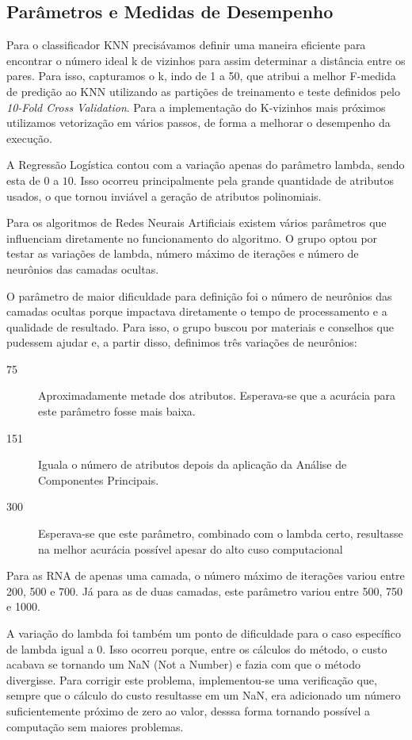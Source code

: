\documentclass[10pt, conference, compsocconf]{IEEEtran}
\begin{document}
\subsection{Parâmetros e Medidas de Desempenho}
Para o classificador KNN precisávamos definir uma maneira eficiente para 
encontrar o número ideal k de vizinhos para assim determinar a distância entre 
os pares. Para isso, capturamos o k, indo de 1 a 50, que atribui a melhor 
F-medida de predição ao KNN utilizando as partições de treinamento e teste 
definidos pelo \textsl{10-Fold Cross Validation}. Para a implementação do 
K-vizinhos mais próximos utilizamos vetorização em vários passos, de forma a melhorar o desempenho da execução.

A Regressão Logística contou com a variação apenas do parâmetro lambda, sendo
esta de $0$ a $10$. Isso
ocorreu principalmente pela grande quantidade de atributos usados, o que tornou
inviável a geração de atributos polinomiais. 


Para os algoritmos de Redes Neurais Artificiais existem vários parâmetros que
influenciam diretamente no funcionamento do algoritmo. O grupo optou por testar
as variações de lambda, número máximo de iterações e número de neurônios das
camadas ocultas. 

O parâmetro de maior dificuldade para definição foi o número de
neurônios das camadas ocultas porque impactava diretamente o tempo de
processamento e a qualidade de resultado. Para isso, o grupo buscou por
materiais e conselhos que pudessem ajudar e, a partir disso, definimos três
variações de neurônios: 
    \begin{description}
        \item[75]{Aproximadamente metade dos atributos. Esperava-se que a
        acurácia para este parâmetro fosse mais baixa.}
        \item[151]{Iguala o número de atributos depois da aplicação da Análise
        de Componentes Principais.}
        \item[300]{Esperava-se que este parâmetro, combinado com o lambda certo,
        resultasse na melhor acurácia possível apesar do alto cuso
        computacional}
    \end{description}

Para as RNA de apenas uma camada, o número máximo de iterações variou entre 200,
500 e 700. Já para as de duas camadas, este parâmetro variou entre 500, 750 e
1000.

A variação do lambda foi também um ponto de dificuldade para o caso específico
de lambda igual a 0. Isso ocorreu porque, entre os cálculos do método, o custo
acabava se tornando um NaN (Not a Number) e fazia com que o método divergisse.
Para corrigir este problema, implementou-se uma verificação que, sempre que o
cálculo do custo resultasse em um NaN, era adicionado um número suficientemente
próximo de zero ao valor, desssa forma tornando possível a computação sem
maiores problemas.
\end{document}
